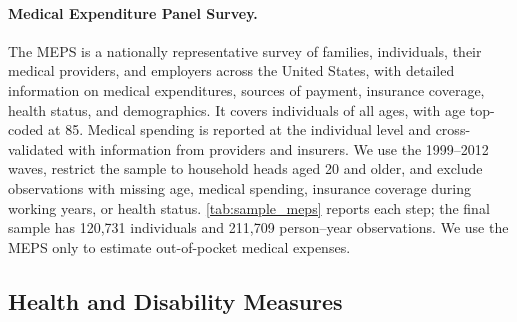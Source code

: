 \paragraph{Medical Expenditure Panel Survey.} The MEPS is a nationally representative survey of families, individuals, their medical providers, and employers across the United States, with detailed information on medical expenditures, sources of payment, insurance coverage, health status, and demographics. It covers individuals of all ages, with age top-coded at 85. %
Medical spending is reported at the individual level and cross-validated with information from providers and insurers. We use the 1999--2012 waves, restrict the sample to household heads aged 20 and older, and exclude observations with missing age, medical spending, insurance coverage during working years, or health status. \autoref{tab:sample_meps} reports each step; the final sample has 120,731 individuals and 211,709 person--year observations. %
We use the MEPS only to estimate out-of-pocket medical expenses.

\begin{table}[!htbp]
\centering
\caption{PSID Sample Selection}\label{tab:sample_psid}
\small

\end{table}

\begin{table}[!htbp]
\centering
\caption{MEPS Sample Selection}\label{tab:sample_meps}
\small

\end{table}

\subsection{Health and Disability Measures}

